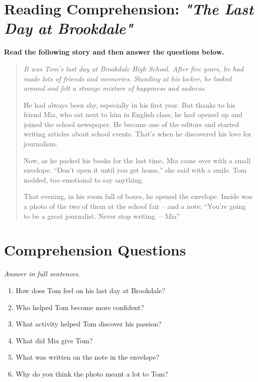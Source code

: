 
\section*{Reading Comprehension: \textit{"The Last Day at Brookdale"}}

\textbf{Read the following story and then answer the questions below.}

\vspace{1em}

\begin{quote}
\itshape
It was Tom’s last day at Brookdale High School. After five years, he had made lots of friends and memories. Standing at his locker, he looked around and felt a strange mixture of happiness and sadness.

He had always been shy, especially in his first year. But thanks to his friend Mia, who sat next to him in English class, he had opened up and joined the school newspaper. He became one of the editors and started writing articles about school events. That’s when he discovered his love for journalism.

Now, as he packed his books for the last time, Mia came over with a small envelope. “Don’t open it until you get home,” she said with a smile. Tom nodded, too emotional to say anything.

That evening, in his room full of boxes, he opened the envelope. Inside was a photo of the two of them at the school fair – and a note: “You’re going to be a great journalist. Never stop writing. – Mia”
\end{quote}

\vspace{1.5em}

\section*{Comprehension Questions}
\textit{Answer in full sentences.}

\begin{enumerate}
  \item How does Tom feel on his last day at Brookdale?
  \item Who helped Tom become more confident?
  \item What activity helped Tom discover his passion?
  \item What did Mia give Tom?
  \item What was written on the note in the envelope?
  \item Why do you think the photo meant a lot to Tom?
\end{enumerate}


